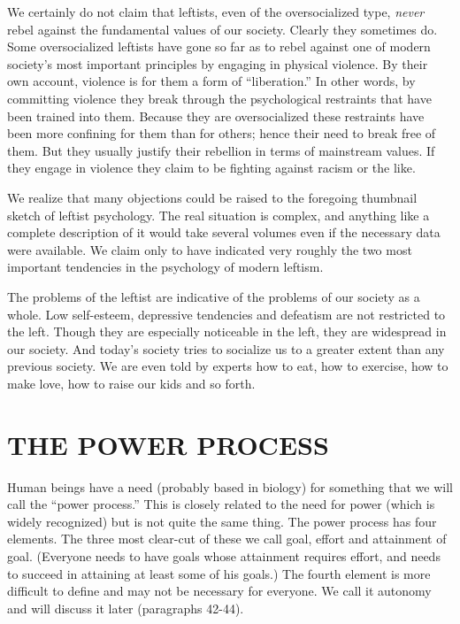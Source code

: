  We certainly do not claim that leftists, even of the oversocialized type, {\em never} rebel against the fundamental values of our society. Clearly they sometimes do. Some oversocialized leftists have gone so far as to rebel against one of modern society’s most important principles by engaging in physical violence. By their own account, violence is for them a form of “liberation.” In other words, by committing violence they break through the psychological restraints that have been trained into them. Because they are oversocialized these restraints have been more confining for them than for others; hence their need to break free of them. But they usually justify their rebellion in terms of mainstream values. If they engage in violence they claim to be fighting against racism or the like.

 We realize that many objections could be raised to the foregoing thumbnail sketch of leftist psychology. The real situation is complex, and anything like a complete description of it would take several volumes even if the necessary data were available. We claim only to have indicated very roughly the two most important tendencies in the psychology of modern leftism.

 The problems of the leftist are indicative of the problems of our society as a whole. Low self-esteem, depressive tendencies and defeatism are not restricted to the left. Though they are especially noticeable in the left, they are widespread in our society. And today’s society tries to socialize us to a greater extent than any previous society. We are even told by experts how to eat, how to exercise, how to make love, how to raise our kids and so forth.

\chapter{THE POWER PROCESS}

 Human beings have a need (probably based in biology) for something that we will call the “power process.” This is closely related to the need for power (which is widely recognized) but is not quite the same thing. The power process has four elements. The three most clear-cut of these we call goal, effort and attainment of goal. (Everyone needs to have goals whose attainment requires effort, and needs to succeed in attaining at least some of his goals.) The fourth element is more difficult to define and may not be necessary for everyone. We call it autonomy and will discuss it later (paragraphs 42-44).

